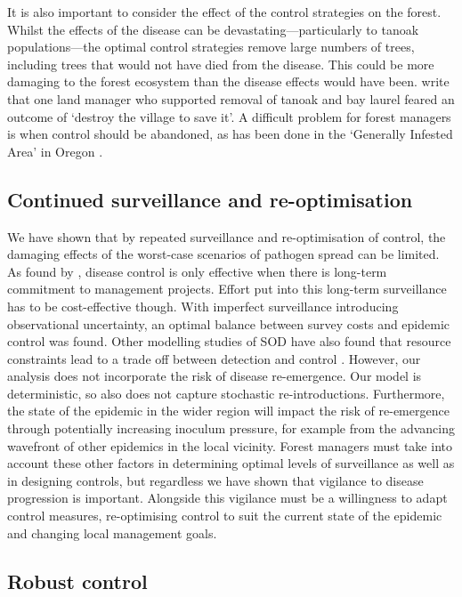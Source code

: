 It is also important to consider the effect of the control strategies on the forest. Whilst the effects of the disease can be devastating---particularly to tanoak populations---the optimal control strategies remove large numbers of trees, including trees that would not have died from the disease. This could be more damaging to the forest ecosystem than the disease effects would have been. \citet{alexander_lessons_2010} write that one land manager who supported removal of tanoak and bay laurel feared an outcome of `destroy the village to save it'. A difficult problem for forest managers is when control should be abandoned, as has been done in the `Generally Infested Area' in Oregon \citep{hansen_efficacy_2019}.

\subsection{Continued surveillance and re-optimisation}

We have shown that by repeated surveillance and re-optimisation of control, the damaging effects of the worst-case scenarios of pathogen spread can be limited. As found by \citet{cobb_resiliency_2017}, disease control is only effective when there is long-term commitment to management projects. Effort put into this long-term surveillance has to be cost-effective though. With imperfect surveillance introducing observational uncertainty, an optimal balance between survey costs and epidemic control was found. Other modelling studies of SOD have also found that resource constraints lead to a trade off between detection and control \citep{ndeffo_mbah_balancing_2010, cunniffe_modelling_2016}. However, our analysis does not incorporate the risk of disease re-emergence. Our model is deterministic, so also does not capture stochastic re-introductions. Furthermore, the state of the epidemic in the wider region will impact the risk of re-emergence through potentially increasing inoculum pressure, for example from the advancing wavefront of other epidemics in the local vicinity. Forest managers must take into account these other factors in determining optimal levels of surveillance as well as in designing controls, but regardless we have shown that vigilance to disease progression is important. Alongside this vigilance must be a willingness to adapt control measures, re-optimising control to suit the current state of the epidemic and changing local management goals.

\subsection{Robust control}


